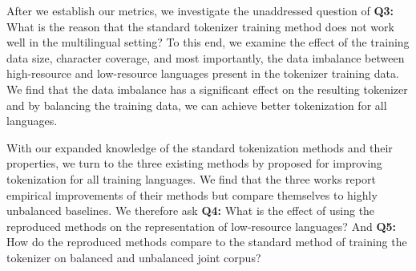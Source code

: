 After we establish our metrics, we investigate the unaddressed question of \textbf{Q3:} What is the reason that the standard tokenizer training method does not work well in the multilingual setting? To this end, we examine the effect of the training data size, character coverage, and most importantly, the data imbalance between high-resource and low-resource languages present in the tokenizer training data. We find that the data imbalance has a significant effect on the resulting tokenizer and by balancing the training data, we can achieve better tokenization for all languages.


%  

With our expanded knowledge of the standard tokenization methods and their properties, we turn to the three existing methods by \citet{chung_improving_2020,zheng_allocating_2021,liang_xlm-v_2023} proposed for improving tokenization for all training languages. We find that the three works report empirical improvements of their methods but compare themselves to highly unbalanced baselines. We therefore ask \textbf{Q4:} What is the effect of using the reproduced methods on the representation of low-resource languages? And
\textbf{Q5:} How do the reproduced methods compare to the standard method of training the tokenizer on balanced and unbalanced joint corpus?

